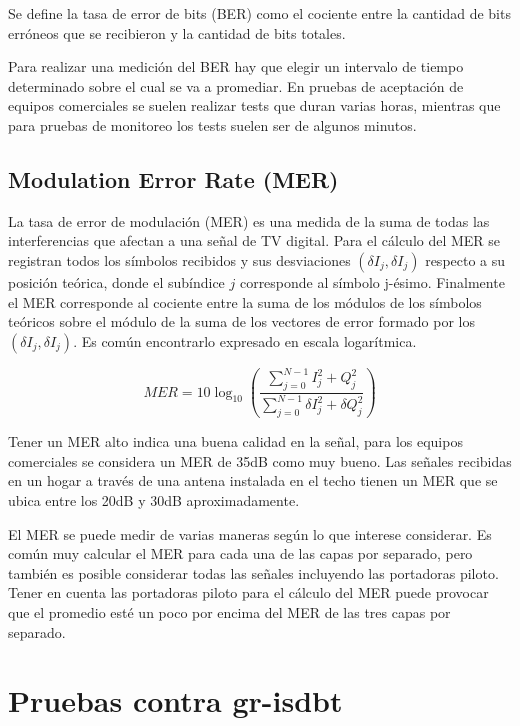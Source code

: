 Se define la tasa de error de bits (BER) como el cociente entre la cantidad de bits erróneos que se recibieron y la cantidad de bits totales.

Para realizar una medición del BER hay que elegir un intervalo de tiempo determinado sobre el cual se va a promediar. En pruebas de aceptación de equipos comerciales se suelen realizar tests que duran varias horas, mientras que para pruebas de monitoreo los tests suelen ser de algunos minutos.

\subsection{Modulation Error Rate (MER)}
La tasa de error de modulación (MER) es una medida de la suma de todas las interferencias que afectan a una señal de TV digital. Para el cálculo del MER se registran todos los símbolos recibidos y sus desviaciones $(\delta I_{j}, \delta I_{j})$ respecto a su posición teórica, donde el subíndice $j$ corresponde al símbolo j-ésimo. Finalmente el MER corresponde al cociente entre la suma de los módulos de los símbolos teóricos sobre el módulo de la suma de los vectores de error formado por los $(\delta I_{j}, \delta I_{j})$. Es común encontrarlo expresado en escala logarítmica. 


\begin{equation}
MER = 10 \log_{10} \left( \dfrac{\sum_{j = 0}^{N-1} I_{j}^{2}+ Q_{j}^{2}}{\sum_{j = 0}^{N-1}\delta I_{j}^{2}+\delta Q_{j}^{2}} \right )
\end{equation}


Tener un MER alto indica una buena calidad en la señal, para los equipos comerciales se considera un MER de 35dB como muy bueno. Las señales recibidas en un hogar a través de una antena instalada en el techo tienen un MER que se ubica entre los 20dB y 30dB aproximadamente. 

El MER se puede medir de varias maneras según lo que interese considerar. Es común muy calcular el MER para cada una de las capas por separado, pero también es posible considerar todas las señales incluyendo las portadoras piloto. Tener en cuenta las portadoras piloto para el cálculo del MER puede provocar que el promedio esté un poco por encima del MER de las tres capas por separado.


\section{Pruebas contra gr-isdbt}

